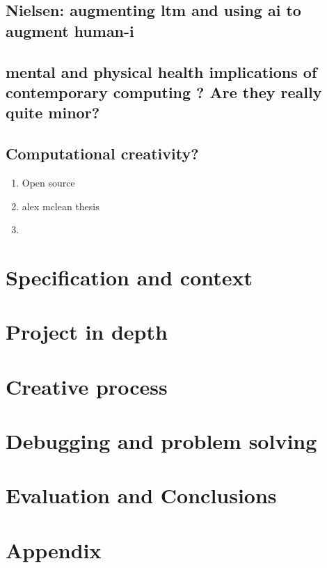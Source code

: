\documentclass[12pt]{report}
\begin{document}
\section{Nielsen: augmenting ltm and using ai to augment human-i}
\label{sec:org5da4105}

\section{mental and physical health implications of contemporary computing ? Are they really quite minor?}
\label{sec:orgd2bec92}

\section{Computational creativity?}
\label{sec:orgffeb2ca}

\begin{enumerate}
\item Open source
\label{sec:orgd6167d4}

\item alex mclean thesis
\label{sec:org25d33d1}

\item 
\label{sec:org307b4f1}
\end{enumerate}

\chapter{Specification and context}
\label{sec:org55c1bab}
\chapter{Project in depth}
\label{sec:orgb71ed72}
\chapter{Creative process}
\label{sec:org3214465}
\chapter{Debugging and problem solving}
\label{sec:org4bc28f7}
\chapter{Evaluation and Conclusions}
\label{sec:org35be2ba}
 


\chapter{Appendix}
\label{sec:org7ecf52f}
\end{document}
